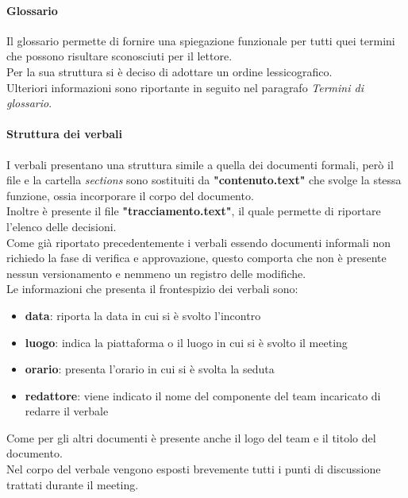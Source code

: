 \paragraph{Glossario}
Il glossario permette di fornire una spiegazione funzionale per tutti quei termini che possono risultare sconosciuti per il lettore.\\
Per la sua struttura si è deciso di adottare un ordine lessicografico.\\
Ulteriori informazioni sono riportante in seguito nel paragrafo \textit{Termini di glossario}.

\paragraph{Struttura dei verbali} 
I verbali presentano una struttura simile a quella dei documenti formali, però il file e la cartella \textit{sections} sono sostituiti da \textbf{"contenuto.text"} che svolge la stessa funzione, ossia incorporare il corpo del documento.\\
Inoltre è presente il file \textbf{"tracciamento.text"}, il quale permette di riportare l'elenco delle decisioni.\\
Come già riportato precedentemente i verbali essendo documenti informali non richiedo la fase di verifica e approvazione, questo comporta che non è presente nessun versionamento e nemmeno un registro delle modifiche.\\ %
Le informazioni che presenta il frontespizio dei verbali sono:
\begin{itemize}
	\item\textbf{data}: riporta la data in cui si è svolto l'incontro %
	\item\textbf{luogo}: indica la piattaforma o il luogo in cui si è svolto il meeting
	\item\textbf{orario}: presenta l'orario in cui si è svolta la seduta
	\item\textbf{redattore}: viene indicato il nome del componente del team incaricato di redarre il verbale
\end{itemize}
Come per gli altri documenti è presente anche il logo del team e il titolo del documento.\\
Nel corpo del verbale vengono esposti brevemente tutti i punti di discussione trattati durante il meeting.\\
